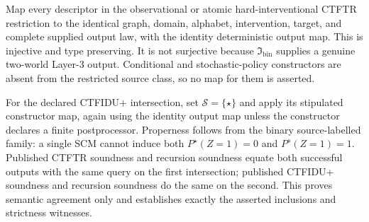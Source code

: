 Map every descriptor in the observational or atomic hard-interventional CTFTR restriction to the identical graph, domain, alphabet, intervention, target, and complete supplied output law, with the identity deterministic output map.  This is injective and type preserving.  It is not surjective because \(\mathfrak I_{\mathrm{bin}}\) supplies a genuine two-world Layer-3 output.  Conditional and stochastic-policy constructors are absent from the restricted source class, so no map for them is asserted.

For the declared CTFIDU+ intersection, set \(\mathcal S=\{\star\}\) and apply its stipulated constructor map, again using the identity output map unless the constructor declares a finite postprocessor.  Properness follows from the binary source-labelled family: a single SCM cannot induce both \(P^\star(Z=1)=0\) and \(P^s(Z=1)=1\).  Published CTFTR soundness and recursion soundness equate both successful outputs with the same query on the first intersection; published CTFIDU+ soundness and recursion soundness do the same on the second.  This proves semantic agreement only and establishes exactly the asserted inclusions and strictness witnesses.